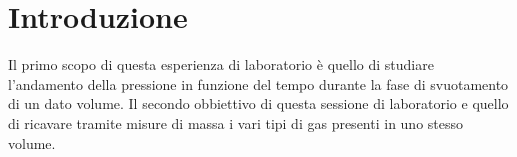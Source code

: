 \section{Introduzione}
Il primo scopo di questa esperienza di laboratorio è quello di studiare l'andamento della pressione in funzione del tempo durante la fase di svuotamento di un dato volume. Il secondo obbiettivo di questa sessione di laboratorio e quello di ricavare tramite misure di massa i vari tipi di gas presenti in uno stesso volume.